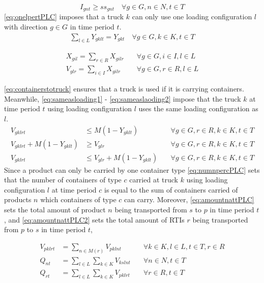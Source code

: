 \begin{equation}
  I_{gnt}\ge ss_{gnt}\quad \forall g \in G,n \in N,t \in T
\end{equation}
\eqref{eq:onelpertPLC} imposes that a truck $k$ can only use one loading configuration $l$ with direction $g\in G $ in time period $t$.
\begin{align}
  \sum_{l\in L}Y_{gklt}=Y_{gkt}\quad \forall g\in G, k \in K ,t \in T \label{eq:onelpertPLC}
\end{align}

\begin{align}
  X_{gil}= \sum_{r \in R} X_{gilr} \quad  & \forall g\in G, i \in I, l     \in L \label{eq:onecperi} \\
  V_{glr} = \sum_{i\in I } X_{gilr} \quad & \forall g\in G, r\in R, l\in L \label{eq:numcinl}
\end{align}

\eqref{eq:containerstotruck} ensures that a truck is used if it is carrying containers. Meanwhile, \eqref{eq:sameasloading1} - \eqref{eq:sameaslaoding2} impose that  the truck $k$ at time period $t$ using loading configuration $l$ uses the same loading configuration as $l$.
\begin{align}
  V_{gklrt}                 & \leq M (1-Y_{gklt}) \quad            & \forall g\in G, r\in R, k \in K, t \in T \label{eq:containerstotruck} \\
  V_{gklrt}+ M (1-Y_{gklt}) & \geq V_{glr}  \quad                  & \forall g\in G, r\in R, k \in K, t \in T \label{eq:sameasloading1}    \\
  V_{gklrt}                 & \leq  V_{glr} + M (1-Y_{gklt}) \quad & \forall g\in G, r\in R, k \in K, t \in T \label{eq:sameaslaoding2}
\end{align}
Since a product can only be carried by one container type \eqref{eq:numnpercPLC} sets that the number of containers of type $c$ carried at truck $k$ using loading configuration $l$ at time period $c$ is equal to the sum of containers carried of products $n$ which containers of type $c$ can carry. Moreover, \eqref{eq:amountnattPLC} sets the total amount of product $n$ being transported from $s$ to $p$ in time period $t$, and \eqref{eq:amountnattPLC2} sets the total amount of RTIs $r$ being transported from $p$ to $s$ in time period $t$,

\begin{align}
  V_{pklrt} & =\sum_{n \in M(r)}{V_{pklnt}}\quad              & \forall k \in K,l \in L,t \in T,r \in R \label{eq:numnpercPLC} \\
  Q_{nt}    & =\sum_{l \in L}{\sum_{k \in K}{V_{kslnt}}}\quad & \forall n \in N,t \in T\label{eq:amountnattPLC}                \\
  Q_{rt}    & =\sum_{l \in L}{\sum_{k \in K}{V_{pklrt}}}\quad & \forall r \in R,t \in T\label{eq:amountnattPLC2}
\end{align}


